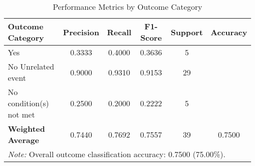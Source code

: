 \begin{table}[!ht]
\centering
\caption{Performance Metrics by Outcome Category}
\label{tab:classification_metrics}
\begin{tabular}{lccccc}
\toprule
\textbf{Outcome Category} & \textbf{Precision} & \textbf{Recall} & \textbf{F1-Score} & \textbf{Support} & \textbf{Accuracy} \\
\midrule
Yes & 0.3333 & 0.4000 & 0.3636 & 5 & \multirow{1}{*}{} \\
No \- Unrelated event & 0.9000 & 0.9310 & 0.9153 & 29 & \multirow{1}{*}{} \\
No \- condition(s) not met & 0.2500 & 0.2000 & 0.2222 & 5 & \multirow{1}{*}{} \\
\midrule
\textbf{Weighted Average} & 0.7440 & 0.7692 & 0.7557 & 39 & 0.7500 \\
\bottomrule
\multicolumn{6}{p{14cm}}{\textit{Note:} Overall outcome classification accuracy: 0.7500 (75.00\%).} \\
\end{tabular}
\end{table}
